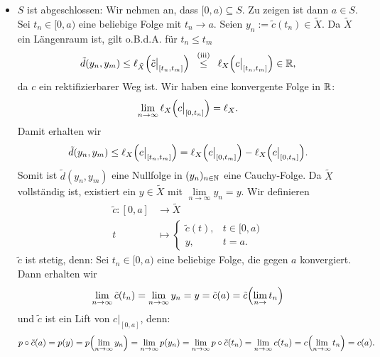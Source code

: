 \begin{beweis}
\begin{itemize}
\begin{figure}[h]
		\end{figure}
		\item $S$ ist abgeschlossen:
		Wir nehmen an, dass $[0,a) \subseteq S$.
		Zu zeigen ist dann $a \in S$.
		Sei $t_n \in [0,a)$ eine beliebige Folge mit $t_n \rightarrow a$.
		Seien $y_n := \tilde{c}(t_n) \in \tilde{X}$.
		Da $\tilde{X}$ ein Längenraum ist, gilt o.B.d.A. für $t_n \leq t_m$
		\[
			\tilde{d}(y_n,y_m) \leq \ell_{\tilde{X}} \enbrace*{\tilde{c}\big|_{[t_n,t_m]}} \stack{\text{(iii)}}{\leq} \ell_X \enbrace*{c \big|_{[t_n,t_m]}} \in \RR,
		\]
		da $c$ ein rektifizierbarer Weg ist.
		Wir haben eine konvergente Folge in $\mathbb{R}$:
		\[
			\lim\limits_{n \rightarrow \infty} \ell_X \enbrace*{c \big|_{[0,t_n]}} = \ell_X.
		\]
		Damit erhalten wir
		\[
			\tilde{d}(y_n,y_m) \leq \ell_X\enbrace*{c \big|_{[t_n,t_m]}} = \ell_X \enbrace*{c \big|_{[0,t_m]}} - \ell_X \enbrace*{c \big|_{[0,t_n]}}.
		\]
		Somit ist $\tilde{d}(y_n,y_m)$ eine Nullfolge in $(y_n)_{n \in \mathbb{N}}$ eine Cauchy-Folge.
		Da $\tilde{X}$ vollständig ist, existiert ein $y \in \tilde{X}$ mit $\lim\limits_{n \rightarrow \infty} y_n = y$.
		Wir definieren
		\begin{align*}
			\tilde{c}\colon [0,a] &\longrightarrow \tilde{X} \\
			t &\longmapsto \begin{cases}
				\tilde{c}(t), & t \in [0,a) \\
				y, & t = a.
			\end{cases}
		\end{align*}
		$\tilde{c}$ ist stetig, denn:
		Sei $t_n \in [0,a)$ eine beliebige Folge, die gegen $a$ konvergiert.
		Dann erhalten wir
		\[
			\lim\limits_{n \rightarrow \infty} \tilde{c}(t_n) = \lim\limits_{n \rightarrow \infty} y_n = y = \tilde{c}(a) = \tilde{c}\enbrace*{\lim\limits_{n \rightarrow} t_n}
		\]
		und $\tilde{c}$ ist ein Lift von $c \big|_{[0,a]}$, denn:
		\[
			p \circ \tilde{c}(a) = p(y) = p \enbrace*{\lim\limits_{n \rightarrow \infty} y_n} = \lim\limits_{n \rightarrow \infty} p(y_n) = \lim\limits_{n \rightarrow \infty} p \circ \tilde{c}(t_n) = \lim\limits_{n \rightarrow \infty} c(t_n) = c \enbrace*{\lim\limits_{n \rightarrow \infty} t_n} = c(a).
\]
\end{itemize}
\end{beweis}
